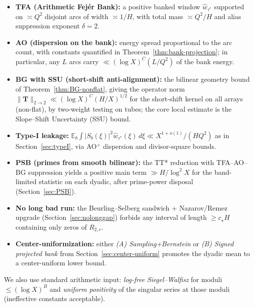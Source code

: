 \begin{itemize}
  \item \textbf{TFA (Arithmetic Fejér Bank):} a positive banked window $\widehat w_{\tau^\ast}$ supported on $\asymp Q^2$ disjoint arcs of width $\asymp 1/H$, with total mass $\asymp Q^2/H$ and alias suppression exponent $\delta=2$.

  \item \textbf{AO (dispersion on the bank):} energy spread proportional to the arc count, with constants quantified in Theorem~\ref{thm:bank-projection}; in particular, any $L$ arcs carry $\ll (\log X)^C(L/Q^2)$ of the bank energy.

  \item \textbf{BG with SSU (short-shift anti-alignment):} the bilinear geometry bound of Theorem~\ref{thm:BG-nonflat}, giving the operator norm
  $\|\mathbf T\|_{2\to 2} \ll (\log X)^C(H/X)^{1/2}$ for the short-shift kernel on all arrays (non-flat), by two-weight testing on tubes; the core local estimate is the Slope–Shift Uncertainty (SSU) bound.

  \item \textbf{Type-I leakage:} $\mathbb{E}_b\!\int |S_b(\xi)|^2 \widehat{w}_{\tau^\ast}(\xi)\,d\xi \ll X^{1+o(1)}/(H Q^2)$ as in Section~\ref{sec:typeI}, via AO$^+$ dispersion and divisor-square bounds.

  \item \textbf{PSB (primes from smooth bilinear):} the TT* reduction with TFA–AO–BG suppression yields a positive main term $\gg H/\log^2 X$ for the band-limited statistic on each dyadic, after prime-power disposal (Section~\ref{sec:PSB}).

  \item \textbf{No long bad run:} the Beurling–Selberg sandwich + Nazarov/Remez upgrade (Section~\ref{sec:nolonggap}) forbids any interval of length $\ge c_\star H$ containing only zeros of $R_{2,c}$.

  \item \textbf{Center-uniformization:} either \emph{(A) Sampling+Bernstein} or \emph{(B) Signed projected bank} from Section~\ref{sec:center-uniform} promotes the dyadic mean to a center-uniform lower bound.
\end{itemize}

We also use standard arithmetic input: \emph{log-free Siegel–Walfisz} for moduli $\le (\log X)^B$ and \emph{uniform positivity} of the singular series at those moduli (ineffective constants acceptable).

